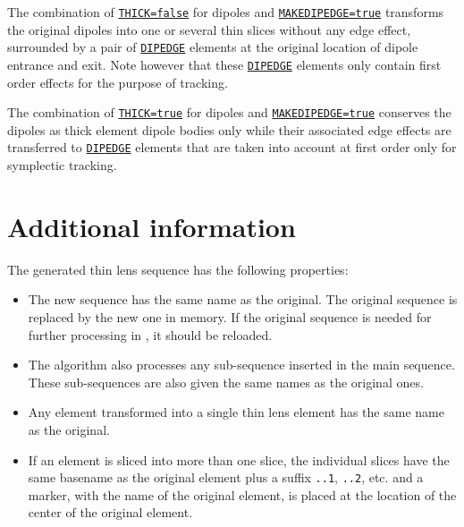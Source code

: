 The combination of \hyperref[sec:numberofslices]{\tt THICK=false} for dipoles 
and \hyperref[sec:makethin]{\tt MAKEDIPEDGE=true} 
transforms the original dipoles into one or several thin slices without 
any edge effect, surrounded by a pair of \hyperref[sec:dipedge]{\tt DIPEDGE} 
elements at the original location of dipole entrance and exit. 
Note however that these \hyperref[sec:dipedge]{\tt DIPEDGE} elements only 
contain first order effects for the purpose of tracking. 

The combination of \hyperref[sec:numberofslices]{\tt THICK=true} for dipoles 
and \hyperref[sec:makethin]{\tt MAKEDIPEDGE=true} 
conserves the dipoles as thick element dipole bodies only while their associated 
edge effects are transferred to \hyperref[sec:dipedge]{\tt DIPEDGE} elements
that are taken into account at first order only for symplectic tracking.

\section{Additional information}

The generated thin lens sequence has the following properties: 
\begin{itemize}
\item The new sequence has the same name as the original. 
  The original sequence is replaced by the new one in memory. 
  If the original sequence is needed for further processing in \madx, 
  it should be reloaded.
\item The algorithm also processes any sub-sequence inserted in the main
  sequence. These sub-sequences are also given the same names as the
  original ones. 
\item Any element transformed into a single thin lens element has the
  same name as the original. 
\item If an element is sliced into more than one slice, the individual
  slices have the same basename as the original element plus a suffix 
  {\tt ..1}, {\tt ..2}, etc. and a marker, with the name of the original
  element, is placed at the location of the center of the original element.
\end{itemize}


